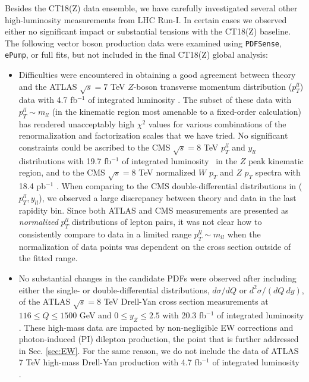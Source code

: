 Besides the CT18(Z) data ensemble, we have carefully investigated several other high-luminosity measurements from LHC Run-I. In certain cases we observed either no significant impact or substantial tensions with the CT18(Z) baseline. The following vector boson production data were examined using {\tt PDFSense}, {\tt ePump}, or full fits, but not included in the final CT18(Z) global analysis:
\begin{itemize}
\item Difficulties were encountered in obtaining a good agreement between theory and the ATLAS $\sqrt{s}=7$ TeV $Z$-boson transverse momentum distribution ($p_T^{ll}$) data with 4.7 fb$^{-1}$ of integrated luminosity \cite{Aad:2014xaa}. The subset of these data with $p_T^{ll} \sim m_{ll}$ (in the kinematic region most amenable to a fixed-order calculation) has rendered unacceptably high $\chi^2$ values for various combinations of the renormalization and factorization scales that we have tried. 
No significant constraints could be ascribed to the CMS $\sqrt{s}=8$ TeV $p_T^{ll}$ and  $y_{ll}$ distributions with 19.7 fb$^{-1}$ of integrated luminosity~\cite{Khachatryan:2015oaa} in the
$Z$ peak kinematic region, and to the CMS $\sqrt{s}=8$ TeV normalized $W$ $p_T$ and $Z$ $p_T$ spectra with 18.4 pb$^{-1}$ \cite{Khachatryan:2016nbe}. 
When comparing to the CMS double-differential distributions in ($p_T^{ll},y_{ll}$), we observed a large discrepancy between theory and data in the last rapidity bin.
Since both ATLAS and  CMS measurements are presented as  {\it normalized} $p_T^{ll}$ distributions of lepton pairs, it was not clear how to consistently compare to data in a limited range $p_T^{ll} \sim m_{ll}$ when the normalization of data points was dependent on the cross section outside of the fitted range. 

\item  No substantial changes in the candidate PDFs were observed after including either
the single- or double-differential distributions, $d \sigma/dQ$ or $d^2 \sigma/(dQ\ dy)$, of the ATLAS $\sqrt{s}=8$ TeV Drell-Yan cross section measurements at $116 \leq Q\leq 1500$ GeV and $0 \leq y_Z\leq2.5$ with 20.3 fb$^{-1}$ of integrated luminosity \cite{Aad:2016zzw}. These high-mass data are impacted by non-negligible EW corrections and photon-induced (PI) dilepton production, the point that is further addressed in Sec. \ref{sec:EW}. For the same reason, we do not include the data of ATLAS 7 TeV high-mass Drell-Yan production with 4.7 fb$^{-1}$ of integrated luminosity \cite{Aad:2013iua}.
 

\end{itemize}
